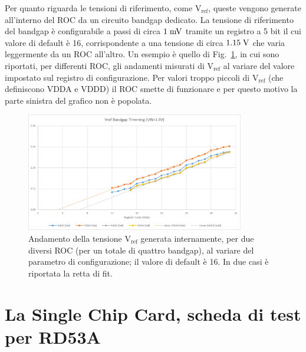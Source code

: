 Per quanto riguarda le tensioni di riferimento, come $\mathrm{V_{ref}}$, queste vengono generate all'interno del ROC da un circuito bandgap dedicato.
La tensione di riferimento del bandgap è configurabile a passi di circa $1\rm \; mV$ tramite un registro a 5 bit il cui valore di default \`e 16, corrispondente a una tensione di circa $1.15\rm \; V$ che varia leggermente da un ROC all'altro.
Un esempio è quello di Fig.~\ref{bandgap_trimming}, in cui sono riportati, per differenti ROC, gli andamenti misurati di $\mathrm{V_{ref}}$ al variare del valore impostato sul registro di configurazione. Per valori troppo piccoli di $\mathrm{V_{ref}}$ (che definiscono VDDA e VDDD) il ROC smette di funzionare e per questo motivo la parte sinistra del grafico non \`e popolata.
\begin{figure}
\centering
\includegraphics[width=0.85\textwidth]{Immagini/bandgap_trimming}
\caption{Andamento della tensione $\mathrm{V_{ref}}$ generata internamente, per due diversi ROC (per un totale di quattro bandgap), al variare del parametro di configurazione; il valore di default è 16. In due casi \`e riportata la retta di fit.}
\label{bandgap_trimming}
\end{figure}

\section{La Single Chip Card, scheda di test per RD53A}

